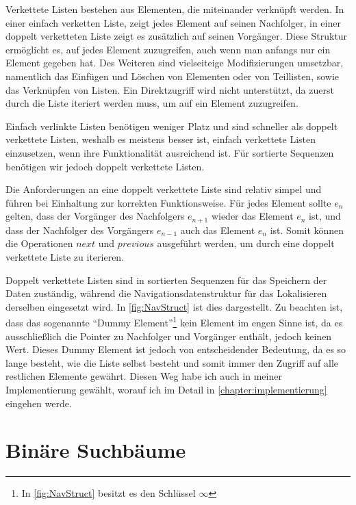 Verkettete Listen bestehen aus Elementen, die miteinander verknüpft werden. In einer einfach verketten Liste, zeigt jedes Element auf seinen Nachfolger, in einer doppelt verketteten Liste zeigt es zusätzlich auf seinen Vorgänger. Diese Struktur ermöglicht es, auf jedes Element zuzugreifen, auch wenn man anfangs nur ein Element gegeben hat. Des Weiteren sind vielseiteige Modifizierungen umsetzbar, namentlich das Einfügen und Löschen von Elementen oder von Teillisten, sowie das Verknüpfen von Listen. Ein Direktzugriff wird nicht unterstützt, da zuerst durch die Liste iteriert werden muss, um auf ein Element zuzugreifen.
\par
Einfach verlinkte Listen benötigen weniger Platz und sind schneller als doppelt verkettete Listen, weshalb es meistens besser ist, einfach verkettete Listen einzusetzen, wenn ihre Funktionalität ausreichend ist. Für sortierte Sequenzen benötigen wir jedoch doppelt verkettete Listen. \cite{Sanders:19}
\par
Die Anforderungen an eine doppelt verkettete Liste sind relativ simpel und führen bei Einhaltung zur korrekten Funktionsweise. Für jedes Element sollte $e_n$ gelten, dass der Vorgänger des Nachfolgers $e_{n+1}$ wieder das Element $e_n$ ist, und dass der Nachfolger des Vorgängers $e_{n-1}$ auch das Element $e_n$ ist. Somit können die Operationen $next$ und $previous$ ausgeführt werden, um durch eine doppelt verkettete Liste zu iterieren.\cite{Sanders:19}
\par
Doppelt verkettete Listen sind in sortierten Sequenzen für das Speichern der Daten zuständig, während die Navigationsdatenstruktur für das Lokalisieren derselben eingesetzt wird. In \autoref{fig:NavStruct} ist dies dargestellt. Zu beachten ist, dass das sogenannte "`Dummy Element"'\footnote{In \autoref{fig:NavStruct} besitzt es den Schlüssel $\infty$} kein Element im engen Sinne ist, da es ausschließlich die Pointer zu Nachfolger und Vorgänger enthält, jedoch keinen Wert. Dieses Dummy Element ist jedoch von entscheidender Bedeutung, da es so lange besteht, wie die Liste selbst besteht und somit immer den Zugriff auf alle restlichen Elemente gewährt. Diesen Weg habe ich auch in meiner Implementierung gewählt, worauf ich im Detail in \autoref{chapter:implementierung} eingehen werde.


\section{Binäre Suchbäume}
\label{section:binary-trees}

